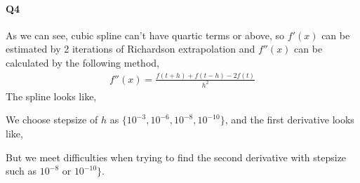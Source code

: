 \documentclass[11pt]{article}
\begin{document}
\paragraph{Q4}
As we can see, cubic spline can't have quartic terms or above, so $f'(x)$ can be estimated by 2 iterations of Richardson extrapolation and $f''(x)$ can be calculated by the following method,
\begin{align}
	f''(x)=\frac{f(t+h)+f(t-h)-2f(t)}{h^2}
\end{align}
The spline looks like,
\begin{figure}[H]
	\centering
\end{figure}
We choose stepsize of $h$ as $\{10^{-3},10^{-6},10^{-8},10^{-10}\}$, and the first derivative looks like,
\begin{figure}[H]
	\centering
\end{figure}
But we meet difficulties when trying to find the second derivative with stepsize such as $10^{-8}$ or $10^{-10}\}$.
\end{document}
